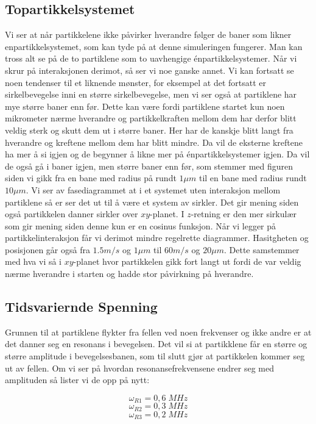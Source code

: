 \documentclass[reprint,english,notitlepage, nofootinbib]{revtex4-1}  %
\begin{document}
\subsection*{Topartikkelsystemet}
Vi ser at når partikkelene ikke påvirker hverandre følger de baner som likner enpartikkelsystemet, som kan tyde på at denne simuleringen fungerer. Man kan tross alt se på de to partiklene som to uavhengige énpartikkelsystemer. Når vi skrur på interaksjonen derimot, så ser vi noe ganske annet. Vi kan fortsatt se noen tendenser til et liknende mønster, for eksempel at det fortsatt er sirkelbevegelse inni en større sirkelbevegelse, men vi ser også at partiklene har mye større baner enn før. Dette kan være fordi partiklene startet kun noen mikrometer nærme hverandre og partikkelkraften mellom dem har derfor blitt veldig sterk og skutt dem ut i større baner. Her har de kanskje blitt langt fra hverandre og kreftene mellom dem har blitt mindre. Da vil de eksterne kreftene ha mer å si igjen og de begynner å likne mer på énpartikkelsystemer igjen. Da vil de også gå i baner igjen, men større baner enn før, som stemmer med figuren siden vi gikk fra en bane med radius på rundt $1\mu m$ til en bane med radius rundt $10\mu m$.
\newline Vi ser av fasediagrammet at i et systemet uten interaksjon mellom partiklene så er ser det ut til å være et system av sirkler. Det gir mening siden også partikkelen danner sirkler over $xy$-planet. I $z$-retning er den mer sirkulær som gir mening siden denne kun er en cosinus funksjon. Når vi legger på partikkelinteraksjon får vi derimot mindre regelrette diagrammer. Hasitgheten og posisjonen går også fra $1.5m/s$ og $1\mu m$ til $60m/s$ og $20\mu m$. Dette samstemmer med hva vi så i $xy$-planet hvor partikkelen gikk fort langt ut fordi de var veldig nærme hverandre i starten og hadde stor påvirkning på hverandre.


\subsection*{Tidsvariernde Spenning}

Grunnen til at partiklene flykter fra fellen ved noen frekvenser og ikke andre er at det danner seg en resonans i bevegelsen. Det vil si at partikklene får en større og større amplitude i bevegelsesbanen, som til slutt gjør at partikkelen kommer seg ut av fellen. Om vi ser på hvordan resonansefrekvensene endrer seg med amplituden så lister vi de opp på nytt:

$$\omega_{R1} = 0,6 \; MHz$$
$$\omega_{R2} = 0,3 \; MHz $$
$$\omega_{R3} = 0,2 \; MHz $$
\end{document}
